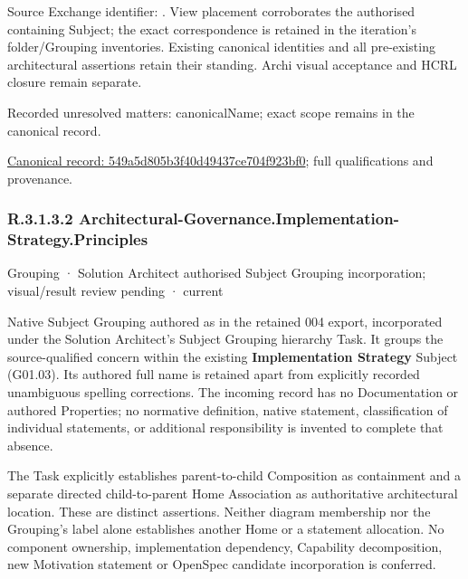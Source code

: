 Source Exchange identifier: \texttt{}. View placement corroborates
the authorised containing Subject; the exact correspondence is retained in the
iteration's folder/Grouping inventories. Existing canonical identities and all
pre-existing architectural assertions retain their standing. Archi visual
acceptance and HCRL closure remain separate.


{\small Recorded unresolved matters: canonicalName; exact scope remains in the canonical record.}\par
{\footnotesize \href{../../../../continuum/grouping/549a5d805b3f40d49437ce704f923bf0.md}{Canonical record: 549a5d805b3f40d49437ce704f923bf0}; full qualifications and provenance.}\par
\subsubsection*{R.3.1.3.2 Architectural-Governance.Implementation-Strategy.Principles}
\label{navigation:R.3.1.3.2}

\label{element:93adee1dcb7348dd8bc070e7a53264f6}
{\small Grouping · Solution Architect authorised Subject Grouping incorporation; visual/result review pending · current}\par

Native Subject Grouping authored as \texttt{} in the retained 004 export,
incorporated under the Solution Architect's Subject Grouping hierarchy Task.
It groups the source-qualified \texttt{} concern within
the existing \textbf{Implementation Strategy} Subject (G01.03). Its authored full name
is retained apart from explicitly recorded unambiguous spelling corrections.
The incoming record has no Documentation or authored Properties; no normative
definition, native statement, classification of individual statements, or
additional responsibility is invented to complete that absence.



The Task explicitly establishes parent-to-child Composition as containment and
a separate directed child-to-parent Home Association as authoritative architectural
location. These are distinct assertions. Neither diagram membership nor the
Grouping's label alone establishes another Home or a statement allocation.
No component ownership, implementation dependency, Capability decomposition,
new Motivation statement or OpenSpec candidate incorporation is conferred.



